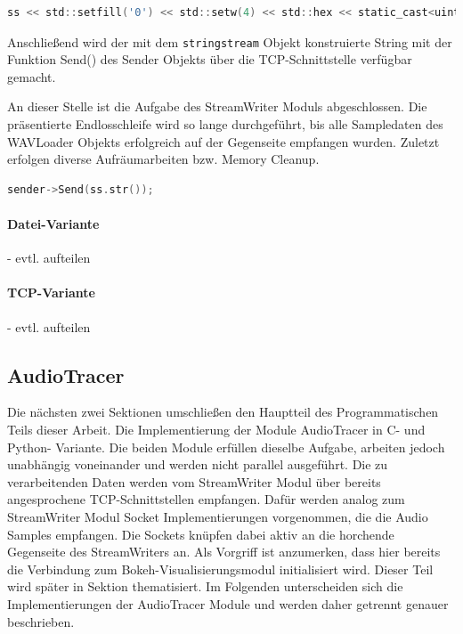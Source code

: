 \begin{lstlisting}[language=C, frame=none]
	ss << std::setfill('0') << std::setw(4) << std::hex << static_cast<uint32_t>(sample);
\end{lstlisting} 

Anschließend wird der mit dem \texttt{stringstream} Objekt konstruierte String mit der Funktion Send() des Sender Objekts über die TCP-Schnittstelle verfügbar gemacht.

An dieser Stelle ist die Aufgabe des StreamWriter Moduls abgeschlossen. Die präsentierte Endlosschleife wird so lange durchgeführt, bis alle Sampledaten des WAVLoader Objekts erfolgreich auf der Gegenseite empfangen wurden. Zuletzt erfolgen diverse Aufräumarbeiten bzw. Memory Cleanup.

\begin{lstlisting}[language=C, frame=none]
	sender->Send(ss.str());
\end{lstlisting}

\paragraph{Datei-Variante}
	- evtl. aufteilen
\paragraph{TCP-Variante}
	- evtl. aufteilen
	
\subsection{AudioTracer} \label{sec:audiotracer}

Die nächsten zwei Sektionen umschließen den Hauptteil des Programmatischen Teils dieser Arbeit. Die Implementierung der Module AudioTracer in C- und Python- Variante. Die beiden Module erfüllen dieselbe Aufgabe, arbeiten jedoch unabhängig voneinander und werden nicht parallel ausgeführt. Die zu verarbeitenden Daten werden vom StreamWriter Modul über bereits angesprochene TCP-Schnittstellen empfangen. Dafür werden analog zum StreamWriter Modul Socket Implementierungen vorgenommen, die die Audio Samples empfangen. Die Sockets knüpfen dabei aktiv an die horchende Gegenseite des StreamWriters an. Als Vorgriff ist anzumerken, dass hier bereits die Verbindung zum Bokeh-Visualisierungsmodul initialisiert wird. Dieser Teil wird später in Sektion  thematisiert. Im Folgenden unterscheiden sich die Implementierungen der AudioTracer Module und werden daher getrennt genauer beschrieben.

